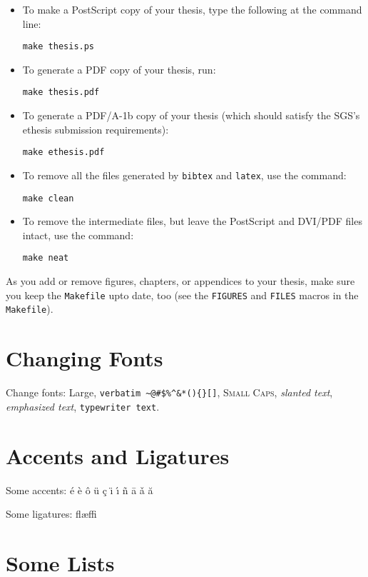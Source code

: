 \begin{itemize}
\item To make a PostScript copy of your thesis, type the following
at the command line:

\texttt{make thesis.ps}

\item To generate a PDF copy of your thesis, run:

\texttt{make thesis.pdf}

\item To generate a PDF/A-1b copy of your thesis (which should
satisfy the SGS's ethesis submission requirements):

\texttt{make ethesis.pdf}

\item To remove all the files generated by \texttt{bibtex} and
\texttt{latex}, use the command:

\texttt{make clean}

\item To remove the intermediate files, but leave the PostScript
and DVI/PDF files intact, use the command:

\texttt{make neat}
\end{itemize}

As you add or remove figures, chapters, or appendices to your thesis,
make sure you keep the \texttt{Makefile} upto date, too (see the
\texttt{FIGURES} and \texttt{FILES} macros in the \texttt{Makefile}).

\section{Changing Fonts}

Change fonts: {\Large Large},
\verb+verbatim ~@#$%^&*(){}[]+,
\textsc{Small Caps},
\textsl{slanted text},
\emph{emphasized text},
\texttt{typewriter text}.

\section{Accents and Ligatures}

Some accents:
\'{e}
\`{e}
\^{o}
\"{u}
\c{c}
\"{\i}
\'{\i}
\~{n}
\={a}
\v{a}
\u{a}

\noindent Some ligatures:
fl{\ae}ffi


\section{Some Lists}

